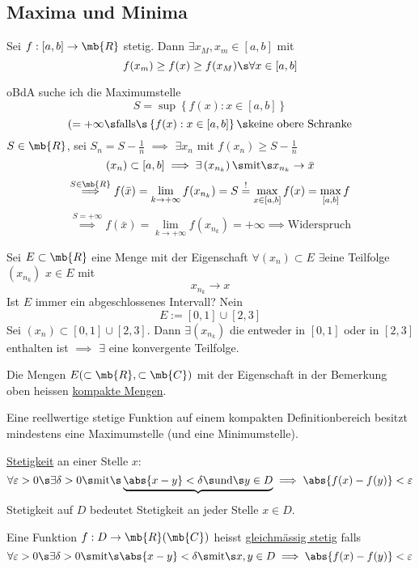 \subsection{Maxima und Minima}
\begin{Sat}
  Sei $f:[a,b]\to\mb{R}$ stetig. Dann $\exists x_M, x_m\in [a,b]$ mit
  \[f(x_m)\geq f(x)\geq f(x_M)\s\forall x\in [a,b]\]
\end{Sat}
\begin{Bew}
  oBdA suche ich die Maximumstelle
  \[S=\sup \left\{ f(x):x\in\left[ a,b \right] \right\}\]
  \[(=+\infty\s\text{falls}\s\left\{ f(x):x\in\left[ a,b \right] \right\}\s\text{keine obere Schranke}\]
  $S\in\mb{R}$, sei $S_n=S-\frac{1}{n}$ $\implies$ $\exists x_n$ mit $f(x_n)\geq S-\frac{1}{n}$
  \[(x_n)\subset\left[ a,b \right]\implies\exists\left( x_{n_k} \right)\s\text{mit}\s x_{n_k}\to \bar x\]
  \[\stackrel{S\in \mb{R}}{\implies}f(\bar x)=\lim_{k\to+\infty}f(x_{n_k})=S\stackrel{!}{=}\max_{x\in\left[ a,b \right]}f(x)=\max_{\left[ a,b \right]} f\]
  \[\stackrel{S=+\infty}{\implies}f(\bar x)=\lim_{k\to +\infty}f(x_{n_k})=+\infty\implies \text{Widerspruch}\]
\end{Bew}
\begin{Bem}
  Sei $E\subset\mb{R}$ eine Menge mit der Eigenschaft $\forall (x_n)\subset E$ $\exists$eine Teilfolge $(x_{n_k})$ $x\in E$ mit
  \[x_{n_k}\to x\]
  Ist $E$ immer ein abgeschlossenes Intervall? Nein
  \[E:=\left[ 0,1 \right]\cup \left[ 2,3 \right]\]
  Sei $(x_n)\subset\left[ 0,1 \right]\cup\left[ 2,3 \right]$. Dann $\exists\left( x_{n_k} \right)$ die entweder in $\left[ 0,1 \right]$ oder in $\left[ 2,3 \right]$ enthalten ist $\implies$ $\exists$ eine konvergente Teilfolge.
\end{Bem}
\begin{Def}
  Die Mengen $E(\subset\mb{R},\subset\mb{C})$ mit der Eigenschaft in der Bemerkung oben heissen \ul{kompakte Mengen}.
\end{Def}
\begin{Sat}
  Eine reellwertige stetige Funktion auf einem kompakten Definitionbereich besitzt mindestens eine Maximumstelle (und eine Minimumstelle).
\end{Sat}
\begin{Def}
  \ul{Stetigkeit} an einer Stelle $x$:
  \[\forall \varepsilon>0\s\exists\delta>0\s\text{mit}\s\underbrace{\abs{x-y}<\delta\s\text{und}\s y\in D}\implies \abs{f(x)-f(y)}<\varepsilon\]
  Stetigkeit auf $D$ bedeutet Stetigkeit an jeder Stelle $x\in D$.
\end{Def}
\begin{Def}
  Eine Funktion $f:D\to\mb{R}(\mb{C})$ heisst \ul{gleichmässig stetig} falls
  \[\forall \varepsilon>0\s\exists\delta>0\s\text{mit}\s\abs{x-y}<\delta\s\text{mit}\s x,y\in D\implies \abs{f(x)-f(y)}<\varepsilon\]
\end{Def}
